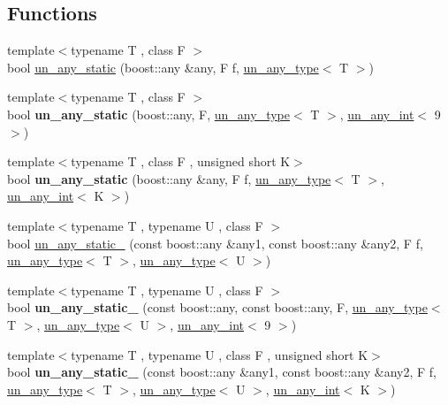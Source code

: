 \subsection*{Functions}
\begin{DoxyCompactItemize}
\item 
{\footnotesize template$<$typename T , class F $>$ }\\bool \mbox{\hyperlink{group__boost__any__stuff_ga8ec1a694aa7a5fa58ab801c1ea419fa8}{un\+\_\+any\+\_\+static}} (boost\+::any \&any, F f, \mbox{\hyperlink{struct_s_m_spp__di__unipi__it_1_1un__any__type}{un\+\_\+any\+\_\+type}}$<$ T $>$)
\item 
{\footnotesize template$<$typename T , class F $>$ }\\bool {\bfseries un\+\_\+any\+\_\+static} (boost\+::any, F, \mbox{\hyperlink{struct_s_m_spp__di__unipi__it_1_1un__any__type}{un\+\_\+any\+\_\+type}}$<$ T $>$, \mbox{\hyperlink{struct_s_m_spp__di__unipi__it_1_1un__any__int}{un\+\_\+any\+\_\+int}}$<$ 9 $>$)
\item 
{\footnotesize template$<$typename T , class F , unsigned short K$>$ }\\bool {\bfseries un\+\_\+any\+\_\+static} (boost\+::any \&any, F f, \mbox{\hyperlink{struct_s_m_spp__di__unipi__it_1_1un__any__type}{un\+\_\+any\+\_\+type}}$<$ T $>$, \mbox{\hyperlink{struct_s_m_spp__di__unipi__it_1_1un__any__int}{un\+\_\+any\+\_\+int}}$<$ K $>$)
\item 
{\footnotesize template$<$typename T , typename U , class F $>$ }\\bool \mbox{\hyperlink{group__boost__any__stuff_ga69348da148035f5453d7c1db28f0578b}{un\+\_\+any\+\_\+static\+\_}} (const boost\+::any \&any1, const boost\+::any \&any2, F f, \mbox{\hyperlink{struct_s_m_spp__di__unipi__it_1_1un__any__type}{un\+\_\+any\+\_\+type}}$<$ T $>$, \mbox{\hyperlink{struct_s_m_spp__di__unipi__it_1_1un__any__type}{un\+\_\+any\+\_\+type}}$<$ U $>$)
\item 
{\footnotesize template$<$typename T , typename U , class F $>$ }\\bool {\bfseries un\+\_\+any\+\_\+static\+\_} (const boost\+::any, const boost\+::any, F, \mbox{\hyperlink{struct_s_m_spp__di__unipi__it_1_1un__any__type}{un\+\_\+any\+\_\+type}}$<$ T $>$, \mbox{\hyperlink{struct_s_m_spp__di__unipi__it_1_1un__any__type}{un\+\_\+any\+\_\+type}}$<$ U $>$, \mbox{\hyperlink{struct_s_m_spp__di__unipi__it_1_1un__any__int}{un\+\_\+any\+\_\+int}}$<$ 9 $>$)
\item 
{\footnotesize template$<$typename T , typename U , class F , unsigned short K$>$ }\\bool {\bfseries un\+\_\+any\+\_\+static\+\_} (const boost\+::any \&any1, const boost\+::any \&any2, F f, \mbox{\hyperlink{struct_s_m_spp__di__unipi__it_1_1un__any__type}{un\+\_\+any\+\_\+type}}$<$ T $>$, \mbox{\hyperlink{struct_s_m_spp__di__unipi__it_1_1un__any__type}{un\+\_\+any\+\_\+type}}$<$ U $>$, \mbox{\hyperlink{struct_s_m_spp__di__unipi__it_1_1un__any__int}{un\+\_\+any\+\_\+int}}$<$ K $>$)

\end{DoxyCompactItemize}

